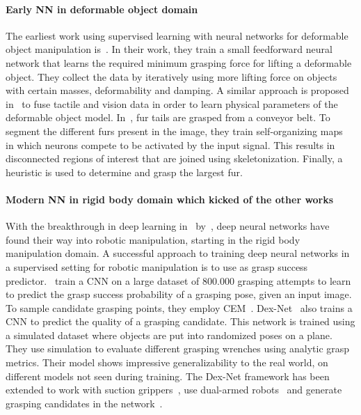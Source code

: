 \documentclass[\home/main.tex]{subfiles}
\begin{document}
\paragraph{Early NN in deformable object domain}
The earliest work using supervised learning with neural networks for deformable object manipulation is~\textcite{Howard2000}. In their work, they train a small feedforward neural network that learns the required minimum grasping force for lifting a deformable object. They collect the data by iteratively using more lifting force on objects with certain masses, deformability and damping. A similar approach is proposed in~\autocite{Khalil2007} to fuse tactile and vision data in order to learn physical parameters of the deformable object model. In~\autocite{Foresti2004}, fur tails are grasped from a conveyor belt. To segment the different furs present in the image, they train self-organizing maps~\autocite{Kohonen1982} in which neurons compete to be activated by the input signal. This results in disconnected regions of interest that are joined using skeletonization. Finally, a heuristic is used to determine and grasp the largest fur.

\paragraph{Modern NN in rigid body domain which kicked of the other works}
With the breakthrough in deep learning in~\citeyear{Krizhevsky2012} by~\textcite{Krizhevsky2012}, deep neural networks have found their way into robotic manipulation, starting in the rigid body manipulation domain. A successful approach to training deep neural networks in a supervised setting for robotic manipulation is to use  as grasp success predictor.~\textcite{Levine2016} train a \acrshort{CNN} on a large dataset of $800.000$ grasping attempts to learn to predict the grasp success probability of a grasping pose, given an input image. To sample candidate grasping points, they employ CEM~\autocite{CEM}. Dex-Net~\autocite{dexnet2} also trains a \acrshort{CNN} to predict the quality of a grasping candidate. This network is trained using a simulated dataset where objects are put into randomized poses on a plane. They use simulation to evaluate different grasping wrenches using analytic grasp metrics. Their model shows impressive generalizability to the real world, on different models not seen during training. The Dex-Net framework has been extended to work with suction grippers~\autocite{dexnet3}, use dual-armed robots~\autocite{dexnet4} and generate grasping candidates in the network~\autocite{Satish2019}.
\end{document}
